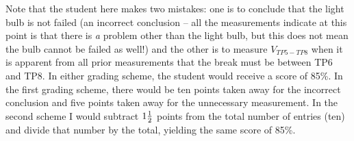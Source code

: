 Note that the student here makes two mistakes: one is to conclude that the light bulb is not failed (an incorrect conclusion -- all the measurements indicate at this point is that there is {\it a} problem other than the light bulb, but this does not mean the bulb cannot be failed as well!) and the other is to measure $V_{TP5-TP8}$ when it is apparent from all prior measurements that the break must be between TP6 and TP8.  In either grading scheme, the student would receive a score of 85\%.  In the first grading scheme, there would be ten points taken away for the incorrect conclusion and five points taken away for the unnecessary measurement.  In the second scheme I would subtract $1 {1 \over 2}$ points from the total number of entries (ten) and divide that number by the total, yielding the same score of 85\%.

\bye

